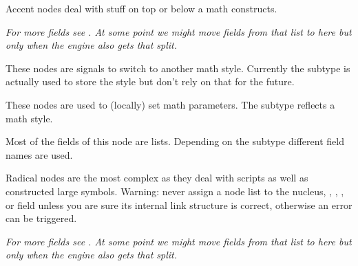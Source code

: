 \startsubsection[title={accent}]

Accent nodes deal with stuff on top or below a math constructs.


{\em For more fields see . At some point we might move fields from
that list to here but only when the engine also gets that split.}


\stopsubsection

\startsubsection[title={style}]

These nodes are signals to switch to another math style. Currently the subtype is
actually used to store the style but don't rely on that for the future.



\stopsubsection

\startsubsection[title={parameter}]

These nodes are used to (locally) set math parameters. The subtype reflects a math style.



\stopsubsection

\startsubsection[title={choice}]

Most of the fields of this node are lists. Depending on the subtype different
field names are used.



\stopsubsection

\startsubsection[title={radical}]

Radical nodes are the most complex as they deal with scripts as well as
constructed large symbols. Warning: never assign a node list to the \type
{nucleus}, , , , or  field unless
you are sure its internal link structure is correct, otherwise an error can be
triggered.


{\em For more fields see . At some point we might move fields from
that list to here but only when the engine also gets that split.}

